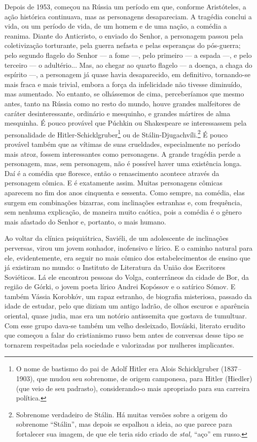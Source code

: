 Depois de 1953, começou na Rússia um período em que, conforme
Aristóteles, a ação histórica continuava, mas as personagens
desapareciam. A tragédia conclui a vida, ou um período de vida, de um
homem e de uma nação, a comédia a reanima. Diante do Anticristo, o
enviado do Senhor, a personagem passou pela coletivização torturante,
pela guerra nefasta e pelas esperanças do pós-guerra; pelo segundo
flagelo do Senhor --- a fome ---, pelo primeiro --- a espada ---, e pelo
terceiro --- o adultério... Mas, ao chegar ao quarto flagelo --- a
doença, a chaga do espírito ---, a personagem já quase havia
desaparecido, em definitivo, tornando-se mais fraca e mais trivial,
embora a força da infelicidade não tivesse diminuído, mas aumentado. No
entanto, se olhássemos de cima, perceberíamos que mesmo antes, tanto na
Rússia como no resto do mundo, houve grandes malfeitores de caráter
desinteressante, ordinário e mesquinho, e grandes mártires de alma
mesquinha. É pouco provável que Púchkin ou Shakespeare se interessassem
pela personalidade de Hitler-Schicklgruber\footnote{O nome de bastismo
  do pai de Adolf Hitler era Alois Schicklgruber (1837\emph{--}1903),
  que mudou seu sobrenome, de origem camponesa, para Hitler (Hiedler)
  (que veio de seu padrasto), considerando-o mais apropriado para sua
  carreira política.} ou de Stálin-Djugachvíli.\footnote{Sobrenome
  verdadeiro de Stálin. Há muitas versões sobre a origem do sobrenome
  ``Stálin'', mas depois se espalhou a ideia, ao que parece para
  fortalecer sua imagem, de que ele teria sido criado de \emph{stal,}
  ``aço'' em russo.} É pouco provável também que as vítimas de suas
crueldades, especialmente no período mais atroz, fossem interessantes
como personagens. A grande tragédia perde a personagem, mas, sem
personagem, não é possível haver uma existência longa. Daí é a comédia
que floresce, então o renascimento acontece através da personagem
cômica. E é exatamente assim. Muitas personagens cômicas aparecem no fim
dos anos cinquenta e sessenta. Como sempre, na comédia, elas surgem em
combinações bizarras, com inclinações estranhas e, com frequência, sem
nenhuma explicação, de maneira muito caótica, pois a comédia é o gênero
mais afastado do Senhor e, portanto, o mais humano.

Ao voltar da clínica psiquiátrica, Saviéli, de um adolescente de
inclinações perversas, virou um jovem sonhador, inofensivo e lírico. E o
caminho natural para ele, evidentemente, era seguir no mais cômico dos
estabelecimentos de ensino que já existiram no mundo: o Instituto de
Literatura da União dos Escritores Soviéticos. Lá ele encontrou pessoas
do Volga, conterrâneos da cidade de Bor, da região de Górki, o jovem
poeta lírico Andrei Kopóssov e o satírico Sómov. E também Vássia
Korobkóv, um rapaz estranho, de biografia misteriosa, passado da idade
de estudar, pelo que diziam um antigo ladrão, de olhos escuros e
aparência oriental, quase judia, mas era um notório antissemita que
gostava de tumultuar. Com esse grupo dava-se também um velho desleixado,
Ilováiski, literato erudito que começou a falar do cristianismo russo
bem antes de conversas desse tipo se tornarem respeitadas pela sociedade
e valorizadas por mulheres implicantes.

